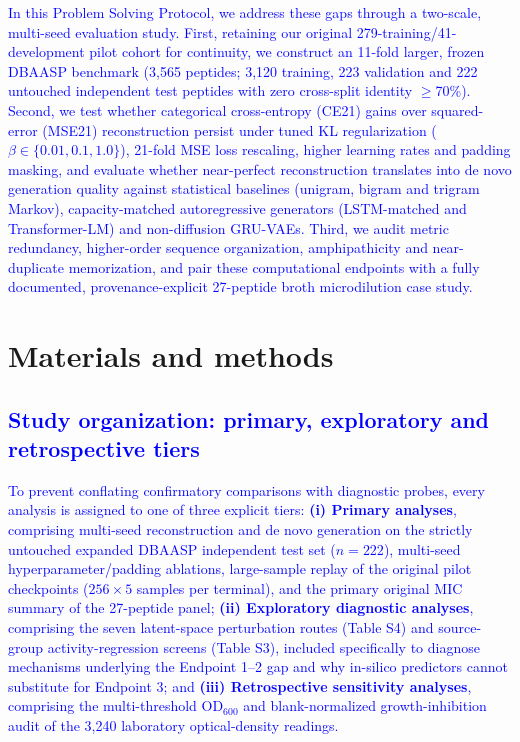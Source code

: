 \documentclass[unnumsec,webpdf,contemporary,large]{oup-authoring-template}
\newcommand{\rev}[1]{\textcolor{blue}{#1}}
\begin{document}
\rev{In this Problem Solving Protocol, we address these gaps through a two-scale, multi-seed evaluation study. First, retaining our original 279-training/41-development pilot cohort for continuity, we construct an 11-fold larger, frozen DBAASP benchmark (3,565 peptides; 3,120 training, 223 validation and 222 untouched independent test peptides with zero cross-split identity $\geq$70\%). Second, we test whether categorical cross-entropy (CE21) gains over squared-error (MSE21) reconstruction persist under tuned KL regularization ($\beta\in\{0.01,0.1,1.0\}$), 21-fold MSE loss rescaling, higher learning rates and padding masking, and evaluate whether near-perfect reconstruction translates into de novo generation quality against statistical baselines (unigram, bigram and trigram Markov), capacity-matched autoregressive generators (LSTM-matched and Transformer-LM) and non-diffusion GRU-VAEs. Third, we audit metric redundancy, higher-order sequence organization, amphipathicity and near-duplicate memorization, and pair these computational endpoints with a fully documented, provenance-explicit 27-peptide broth microdilution case study.}

\section{Materials and methods}

\rev{\subsection{Study organization: primary, exploratory and retrospective tiers}}

\rev{To prevent conflating confirmatory comparisons with diagnostic probes, every analysis is assigned to one of three explicit tiers: \textbf{(i) Primary analyses}, comprising multi-seed reconstruction and de novo generation on the strictly untouched expanded DBAASP independent test set ($n=222$), multi-seed hyperparameter/padding ablations, large-sample replay of the original pilot checkpoints ($256\times 5$ samples per terminal), and the primary original MIC summary of the 27-peptide panel; \textbf{(ii) Exploratory diagnostic analyses}, comprising the seven latent-space perturbation routes (Table S4) and source-group activity-regression screens (Table S3), included specifically to diagnose mechanisms underlying the Endpoint 1--2 gap and why in-silico predictors cannot substitute for Endpoint 3; and \textbf{(iii) Retrospective sensitivity analyses}, comprising the multi-threshold OD$_{600}$ and blank-normalized growth-inhibition audit of the 3,240 laboratory optical-density readings.}
\end{document}
